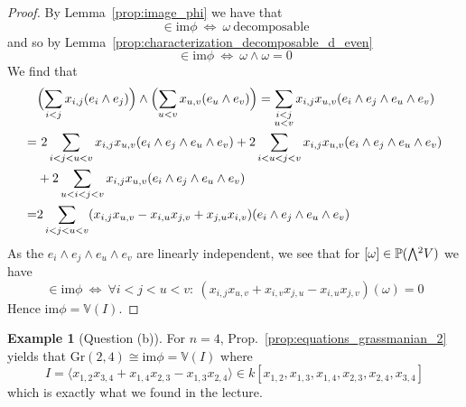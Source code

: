 \documentclass{scrartcl}
\newcommand{\V}{\mathbb{V}}
\newcommand{\Proj}{\mathbb{P}}
\newcommand{\Gr}{\mathrm{Gr}}
\newcommand{\extpow}{\mathchoice{{\textstyle\bigwedge}}
    {{\bigwedge}}
    {{\textstyle\wedge}}
    {{\scriptstyle\wedge}}}
\theoremstyle{definition}
\newtheorem{example}[subsection]{Example}
\begin{document}
\begin{proof}
    By Lemma~\ref{prop:image_phi} we have that
    \begin{equation*}
        [\omega] \in \mathrm{im}\phi \ \Leftrightarrow \ \omega\ \text{decomposable}
    \end{equation*}
    and so by Lemma~\ref{prop:characterization_decomposable_d_even}
    \begin{equation*}
        [\omega] \in \mathrm{im}\phi \ \Leftrightarrow \ \omega \wedge \omega = 0
    \end{equation*}
    We find that
    \begin{align*}
        &\Bigl( \sum_{i < j} x_{i, j} (e_i \wedge e_j) \Bigr) \wedge \Bigl( \sum_{u < v} x_{u, v} (e_u \wedge e_v) \Bigr) = \sum_{\substack{i < j\\u < v}} x_{i, j} x_{u, v} (e_i \wedge e_j \wedge e_u \wedge e_v) \\
        =& \ 2\sum_{\substack{i < j < u < v}} x_{i, j} x_{u, v} (e_i \wedge e_j \wedge e_u \wedge e_v) + 2\sum_{\substack{i < u < j < v}} x_{i, j} x_{u, v} (e_i \wedge e_j \wedge e_u \wedge e_v) \\
        &+ 2\sum_{\substack{u < i < j < v}} x_{i, j} x_{u, v} (e_i \wedge e_j \wedge e_u \wedge e_v) \\
        =&2 \sum_{i < j < u < v} (x_{i, j} x_{u, v} - x_{i, u} x_{j, v} + x_{j, u} x_{i, v}) (e_i \wedge e_j \wedge e_u \wedge e_v)
    \end{align*}
    As the $e_i \wedge e_j \wedge e_u \wedge e_v$ are linearly independent, we see that for $[\omega] \in \Proj(\extpow^2 V)$ we have
    \begin{equation*}
        [\omega] \in \mathrm{im}\phi \ \Leftrightarrow \ \forall i < j < u < v: \ (x_{i, j} x_{u, v} + x_{i, v} x_{j, u} - x_{i, u} x_{j, v})(\omega) = 0
    \end{equation*}
    Hence $\mathrm{im}\phi = \V(I)$.
\end{proof}
\begin{example}[Question (b)]
    For $n = 4$, Prop.~\ref{prop:equations_grassmanian_2} yields that $\Gr(2, 4) \cong \mathrm{im}\phi = \V(I)$ where
    \begin{equation*}
        I = \langle x_{1, 2} x_{3, 4} + x_{1, 4} x_{2, 3} - x_{1, 3} x_{2, 4} \rangle \in k[x_{1, 2}, x_{1, 3}, x_{1, 4}, x_{2, 3}, x_{2, 4}, x_{3, 4}]
    \end{equation*}
    which is exactly what we found in the lecture.
\end{example}
\end{document}
